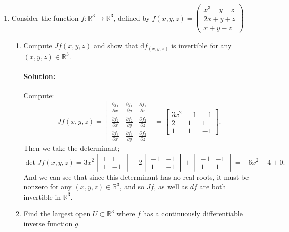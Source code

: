 \documentclass{article}
\begin{document}
\begin{enumerate} 
\item Consider the function $f:\mathbb{R}^3\to\mathbb{R}^3$, defined by  
$f(x,y,z)=\begin{pmatrix}
x^3-y-z\\2x+y+z\\x+y-z
\end{pmatrix}$  
\begin{enumerate}[label= (\alph*)] 
    \item Compute $Jf(x,y,z)$ and show that $\mathrm{d}f_{(x,y,z)}$ is invertible for any $(x,y,z)\in\mathbb{R}^3$.  
    \paragraph{Solution: } Compute:
    \[
     Jf(x,y,z)=\begin{bmatrix}\frac{\partial f_1}{\partial x}&\frac{\partial f_1}{\partial y}&\frac{\partial f_1}{\partial z}\\\frac{\partial f_2}{\partial x}&\frac{\partial f_2}{\partial y}&\frac{\partial f_2}{\partial z}\\ \frac{\partial f_3}{\partial x}&\frac{\partial f_3}{\partial y}&\frac{\partial f_3}{\partial z}\end{bmatrix}
     =\begin{bmatrix} 3x^2&-1&-1\\
     2&1&1\\
     1&1&-1 \end{bmatrix} 
    .\] 
    Then we take the determinant;
    \[
        \det Jf(x,y,z)=3x^2\begin{vmatrix} 1&1\\1&-1 \end{vmatrix} -2\begin{vmatrix} -1&-1\\1&-1 \end{vmatrix} +\begin{vmatrix} -1&-1\\1&1 \end{vmatrix} =-6x^2-4+0
    .\] 
    And we can see that since this determinant has no real roots, it must be nonzero for any $(x,y,z)\in \mathbb{R}^3$, and so $Jf$, as well as $df$ are both invertible in $\mathbb{R}^3$.

    \item Find the largest open $U\subset\mathbb{R}^3$ where $f$ has a continuously differentiable inverse function $g.$  

\end{enumerate}
\end{enumerate}
\end{document}
